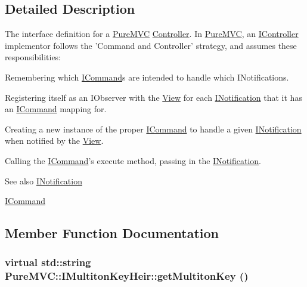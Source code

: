 \subsection{Detailed Description}
The interface definition for a \hyperlink{namespace_pure_m_v_c}{PureMVC} \hyperlink{class_pure_m_v_c_1_1_controller}{Controller}. In \hyperlink{namespace_pure_m_v_c}{PureMVC}, an {\ttfamily \hyperlink{class_pure_m_v_c_1_1_i_controller}{IController}} implementor follows the 'Command and Controller' strategy, and assumes these responsibilities: 
\begin{DoxyItemize}
\item Remembering which {\ttfamily \hyperlink{class_pure_m_v_c_1_1_i_command}{ICommand}}s are intended to handle which {\ttfamily INotifications}. 
\item Registering itself as an {\ttfamily IObserver} with the {\ttfamily \hyperlink{class_pure_m_v_c_1_1_view}{View}} for each {\ttfamily \hyperlink{class_pure_m_v_c_1_1_i_notification}{INotification}} that it has an {\ttfamily \hyperlink{class_pure_m_v_c_1_1_i_command}{ICommand}} mapping for. 
\item Creating a new instance of the proper {\ttfamily \hyperlink{class_pure_m_v_c_1_1_i_command}{ICommand}} to handle a given {\ttfamily \hyperlink{class_pure_m_v_c_1_1_i_notification}{INotification}} when notified by the {\ttfamily \hyperlink{class_pure_m_v_c_1_1_view}{View}}. 
\item Calling the {\ttfamily \hyperlink{class_pure_m_v_c_1_1_i_command}{ICommand}}'s {\ttfamily execute} method, passing in the {\ttfamily \hyperlink{class_pure_m_v_c_1_1_i_notification}{INotification}}. 
\end{DoxyItemize}

\begin{DoxySeeAlso}{See also}
\hyperlink{class_pure_m_v_c_1_1_i_notification}{INotification} 

\hyperlink{class_pure_m_v_c_1_1_i_command}{ICommand} 
\end{DoxySeeAlso}


\subsection{Member Function Documentation}
\hypertarget{class_pure_m_v_c_1_1_i_multiton_key_heir_aecccfb9898368c6377550ceae5730934}{
\subsubsection[{getMultitonKey}]{\setlength{\rightskip}{0pt plus 5cm}virtual std::string PureMVC::IMultitonKeyHeir::getMultitonKey ()}}
\label{class_pure_m_v_c_1_1_i_multiton_key_heir_aecccfb9898368c6377550ceae5730934}


